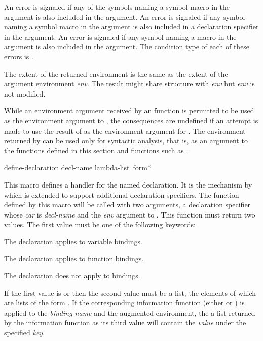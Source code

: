 \begin{newer}
\begin{defun}[Function]
  An error is signaled if any of the symbols naming a symbol macro in the
   argument is also included in the  argument.
  An error is
  signaled if any symbol naming a symbol macro in the  argument is
  also included in a  declaration specifier in the  argument.
  An error is
  signaled if any symbol naming a macro in the  argument is also included
  in the  argument.
  The condition type of each of these errors is .

  The extent of the returned environment is the same as the extent of the
  argument environment {\it env}.  The result might share structure with {\it env}
  but {\it env} is not modified.

  While an environment argument received by an 
  function is permitted to be used as the
  environment argument to , the consequences are undefined if an
  attempt is made to use the result of  as the environment
  argument for .  The environment
  returned by  can be used only for syntactic analysis, that is,
  as an argument to
  the functions defined in this section and functions such as .
\end{defun}

\begin{defmac}
define-declaration decl-name lambda-list {\,form}*

  This macro defines a handler for the named declaration.  It is the mechanism by which
   is extended to support additional declaration
  specifiers.  The function defined by this macro will be called with two
  arguments, a declaration specifier whose {\it car} is {\it decl-name}
  and the {\it env} argument to
  .  This function must return two values.  The
  first value must be one of the following keywords:
\begin{indentdesc}{7pc}
\item[\cd{:variable}]     The declaration applies to variable bindings.
\item[\cd{:function}]     The declaration applies to function bindings.
\item[\cd{:declare}]      The declaration does not apply to bindings.
\end{indentdesc}
If the first value is  or 
then the second value must be a list, the elements of which are lists of the
  form .  If the corresponding information
  function (either  or ) is applied to
  the {\it binding-name} and the augmented environment, the a-list returned
  by the information function as its third value will contain the {\it value}
  under the specified {\it key}.


\end{defmac}
\end{newer}
